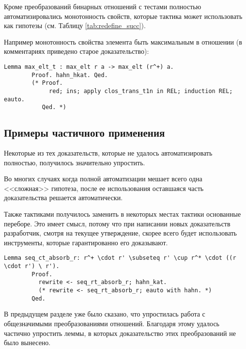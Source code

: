 \documentclass[times
              ,specification
              ,annotation
              ]{itmo-student-thesis}
\begin{document}
      Кроме преобразований бинарных отношений с тестами полностью автоматизировались монотонность
      свойств, которые тактика  может использовать как гипотезы
      (см. Таблицу \ref{tab:redefine_succ}).

      Например монотонность свойства элемента быть максимальным в отношении (в комментариях приведено
      старое доказательство):
      \begin{lstlisting}[float=false, gobble=8]
        Lemma max_elt_t : max_elt r a -> max_elt (r^+) a.
        Proof. hahn_hkat. Qed.
        (* Proof.
             red; ins; apply clos_trans_t1n in REL; induction REL; eauto.
           Qed. *)
      \end{lstlisting}

    \subsection{Примеры частичного применения }
      Некоторые из тех доказательств, которые не удалось автоматизировать полностью, получилось
      значительно упростить.

      Во многих случаях когда полной автоматизации мешает всего одна <<сложная>> гипотеза,
      после ее использования оставшаяся часть доказательства решается автоматически.

      Также тактиками  получилось заменить в некоторых местах тактики основанные переборе.
      Это имеет смысл, потому что при написании новых доказательств разработчик, смотря на текущее
      утверждение, скорее всего будет использовать инструменты, которые гарантированно его доказывают.

      \begin{lstlisting}[float=false, gobble=8, label={lst:auto_replace},
        caption={Пример замены тактики основанной на переборе на \coqe{kat} (в комментариях указано
          старое доказательство)}]
        Lemma seq_ct_absorb_r: r^+ \cdot r' \subseteq r' \cup r^* \cdot ((r \cdot r') \ r').
        Proof.
          rewrite <- seq_rt_absorb_r; hahn_kat.
          (* rewrite <- seq_rt_absorb_r; eauto with hahn. *)
        Qed.
      \end{lstlisting}

      В предыдущем разделе уже было сказано, что упростилась работа с общезначимыми преобразованиями
      отношений. Благодаря этому удалось частично упростить леммы, в которых доказательство этих
      преобразований не было вынесено.
\end{document}
